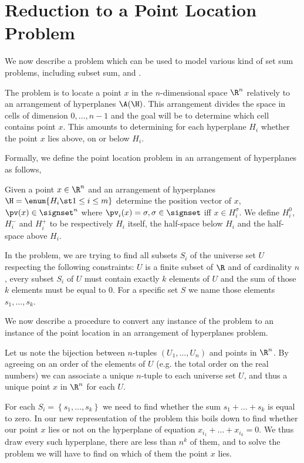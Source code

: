 \section{Reduction to a Point Location Problem}

We now describe a problem which can be used to model
various kind of set sum problems, including subset sum, \kSUM and \kLDT.

The problem is to locate a point \(x\) in the \(n\)-dimensional space \(\R^n\) relatively
to an arrangement of hyperplanes \(\A(\H)\). This arrangement divides the space
in cells of dimension \(0,\ldots,n-1\) and the goal will be to determine which
cell contains point \(x\). This amounts to determining for each
hyperplane \(H_i\) whether the point \(x\) lies above, on or below \(H_i\).

Formally, we define the point location problem in an arrangement of hyperplanes as
follows,

\begin{problem}
Given a point $x \in \R^n$ and an arrangement of hyperplanes $\H = \enum{ H_i
\st 1 \leq i \leq m }$ determine the position vector of $x$, $\pv(x) \in
\signset^n$ where $\pv_i(x) = \sigma, \sigma \in \signset$ iff $x \in
H_i^{\sigma}$. We define $H_i^{0}$, $H_i^{-}$ and $H_i^{+}$ to be
respectively $H_i$ itself, the half-space below $H_i$ and the half-space above
$H_i$.
\end{problem}

In the \kSUM problem, we are trying to find all subsets $S_i$ of the universe set
$U$ respecting the following constraints: $U$ is a finite subset of $\R$ and of
cardinality $n$, every subset $S_i$ of $U$ must contain exactly
$k$ elements of $U$ and the sum of those $k$ elements must be equal to $0$.
For a specific set $S$ we name those elements $s_1, \dots, s_k$.

We now describe a procedure to convert any instance of the \kSUM problem to an
instance of the point location in an arrangement of hyperplanes problem.

Let us note the bijection between $n$-tuples $(U_1, \dots, U_n)$ and points in
$\R^n$. By agreeing on an order of the elements of $U$ (e.g. the total order on
the real numbers) we can associate a unique $n$-tuple to each universe set $U$,
and thus a unique point $x$ in $\R^n$ for each $U$.

For each $S_i = \left\{s_1, \dots, s_k\right\}$ we need to find whether the sum $s_1
+ \dots + s_k$ is equal to zero. In our new representation of the problem this
boils down to find whether our point $x$ lies or not on the hyperplane of
equation $x_{i_1} + \dots + x_{i_k} = 0$. We thus draw every such hyperplane,
there are less than $n^k$ of them, and to solve the problem
we will have to find on which of them the point $x$ lies.


